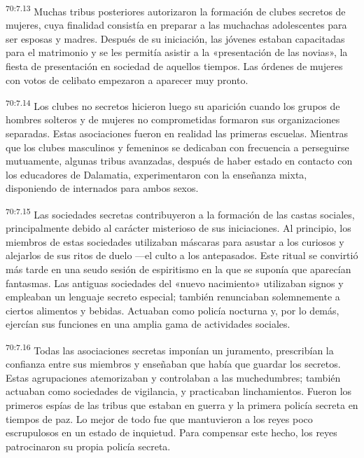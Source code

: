 \par
\textsuperscript{70:7.13} Muchas tribus posteriores autorizaron la formación de clubes secretos de mujeres, cuya finalidad consistía en preparar a las muchachas adolescentes para ser esposas y madres. Después de su iniciación, las jóvenes estaban capacitadas para el matrimonio y se les permitía asistir a la «presentación de las novias», la fiesta de presentación en sociedad de aquellos tiempos. Las órdenes de mujeres con votos de celibato empezaron a aparecer muy pronto.

\par
\textsuperscript{70:7.14} Los clubes no secretos hicieron luego su aparición cuando los grupos de hombres solteros y de mujeres no comprometidas formaron sus organizaciones separadas. Estas asociaciones fueron en realidad las primeras escuelas. Mientras que los clubes masculinos y femeninos se dedicaban con frecuencia a perseguirse mutuamente, algunas tribus avanzadas, después de haber estado en contacto con los educadores de Dalamatia, experimentaron con la enseñanza mixta, disponiendo de internados para ambos sexos.

\par
\textsuperscript{70:7.15} Las sociedades secretas contribuyeron a la formación de las castas sociales, principalmente debido al carácter misterioso de sus iniciaciones. Al principio, los miembros de estas sociedades utilizaban máscaras para asustar a los curiosos y alejarlos de sus ritos de duelo ---el culto a los antepasados. Este ritual se convirtió más tarde en una seudo sesión de espiritismo en la que se suponía que aparecían fantasmas. Las antiguas sociedades del «nuevo nacimiento» utilizaban signos y empleaban un lenguaje secreto especial; también renunciaban solemnemente a ciertos alimentos y bebidas. Actuaban como policía nocturna y, por lo demás, ejercían sus funciones en una amplia gama de actividades sociales.

\par
\textsuperscript{70:7.16} Todas las asociaciones secretas imponían un juramento, prescribían la confianza entre sus miembros y enseñaban que había que guardar los secretos. Estas agrupaciones atemorizaban y controlaban a las muchedumbres; también actuaban como sociedades de vigilancia, y practicaban linchamientos. Fueron los primeros espías de las tribus que estaban en guerra y la primera policía secreta en tiempos de paz. Lo mejor de todo fue que mantuvieron a los reyes poco escrupulosos en un estado de inquietud. Para compensar este hecho, los reyes patrocinaron su propia policía secreta.

